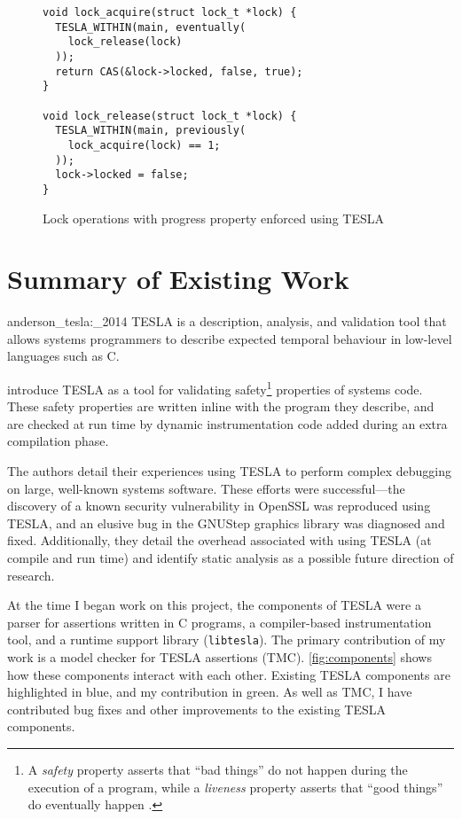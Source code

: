 \begin{figure}
  \begin{verbatim}
void lock_acquire(struct lock_t *lock) {
  TESLA_WITHIN(main, eventually(
    lock_release(lock)
  ));
  return CAS(&lock->locked, false, true);
}

void lock_release(struct lock_t *lock) {
  TESLA_WITHIN(main, previously(
    lock_acquire(lock) == 1;
  ));
  lock->locked = false;
}
  \end{verbatim}
  \caption{Lock operations with progress property enforced using TESLA}
  \label{lst:mutex-better}
\end{figure}

\section{Summary of Existing Work}

\begin{displaycquote}[p.\ 1]{anderson_tesla:_2014}
TESLA is a description, analysis, and validation tool that allows systems
  programmers to describe expected temporal behaviour in low-level languages
  such as C.
\end{displaycquote}

\textcite{anderson_tesla:_2014} introduce TESLA as a tool for validating
safety\footnote{A \emph{safety} property asserts that ``bad things'' do not
happen during the execution of a program, while a \emph{liveness} property
asserts that ``good things'' do eventually happen
\cite{alpern_defining_1984,lamport_proving_1977}.} properties of systems code.
These safety properties are written inline with the program they describe, and
are checked at run time by dynamic instrumentation code added during an extra
compilation phase.

The authors detail their experiences using TESLA to perform complex debugging on
large, well-known systems software. These efforts were successful---the
discovery of a known security vulnerability in OpenSSL was reproduced using
TESLA, and an elusive bug in the GNUStep graphics library was diagnosed and
fixed. Additionally, they detail the overhead associated with using TESLA (at
compile and run time) and identify static analysis as a possible future
direction of research.

At the time I began work on this project, the components of TESLA were a
parser for assertions written in C programs, a compiler-based instrumentation
tool, and a runtime support library (\texttt{libtesla}). The primary
contribution of my work is a model checker for TESLA assertions (TMC).
\autoref{fig:components} shows how these components interact with each other.
Existing TESLA components are highlighted in blue, and my contribution in green.
As well as TMC, I have contributed bug fixes and other improvements to the
existing TESLA components. 

